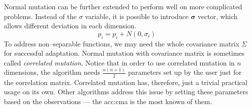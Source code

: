 Normal mutation can be further extended to perform well on more complicated problems. Instead of the $\sigma$ variable, it is possible to introduce $\boldsymbol{\sigma}$ vector, which allows different deviation in each dimension.
$$
p_i = p_i + N(0,\sigma_i)
$$ 
To address non--separable functions, we may need the whole covariance matrix $\Sigma$ for successful adaptation. Normal mutation with covariance matrix is sometimes called \emph{correlated mutation}. Notice that in order to use correlated mutation in $n$ dimensions, the algorithm needs $\frac{n\left(n+1\right)}{2}$ parameters set up by the user just for the correlation matrix. Correlated mutation has, therefore, just a trivial practical usage on its own. Other algorithms address this issue by setting these parameters based on the observations --- the \acrfull{acc:cma} is the most known of them.

